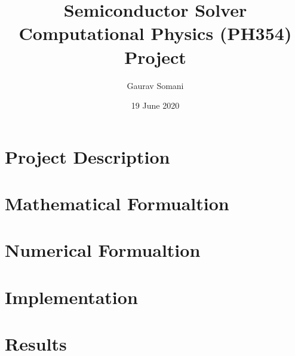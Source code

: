 \documentclass{article}
\title{ \huge Semiconductor Solver \\
  \large Computational Physics (PH354) Project}
\author{Gaurav Somani}
\date{19 June 2020}
\begin{document}
\maketitle
{}
\newpage
{}

\setcounter{section}{-1}
\section{Project Description}


\section{Mathematical Formualtion}


\section{Numerical Formualtion}


\section{Implementation}


\section{Results}


\clearpage


\end{document}
